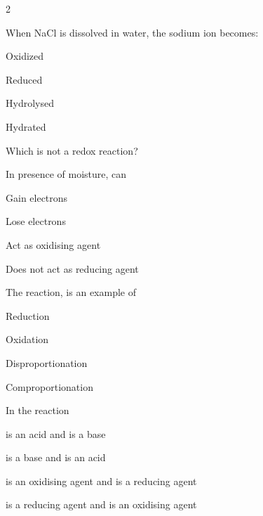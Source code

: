\documentclass[10pt,a4paper]{article}
\begin{document}
\begin{multicols}{2}
\begin{questions}
\item When NaCl is dissolved in water, the sodium ion becomes:
\begin{options}
  \item Oxidized
  \item Reduced
  \item Hydrolysed
  \item Hydrated
\end{options}

\item Which is not a redox reaction?
\begin{options}
  \item {}
  \item {}
  \item {}
  \item {}
\end{options}

\item In presence of moisture,  can
\begin{options}
  \item Gain electrons
  \item Lose electrons
  \item Act as oxidising agent
  \item Does not act as reducing agent
\end{options}

\item The reaction,  is an example of
\begin{options}
  \item Reduction
  \item Oxidation
  \item Disproportionation
  \item Comproportionation
\end{options}

\item In the reaction 
\begin{options}
  \item {} is an acid and  is a base
  \item {} is a base and  is an acid
  \item {} is an oxidising agent and  is a reducing agent
  \item {} is a reducing agent and  is an oxidising agent
\end{options}


\end{questions}
\end{multicols}
\end{document}
